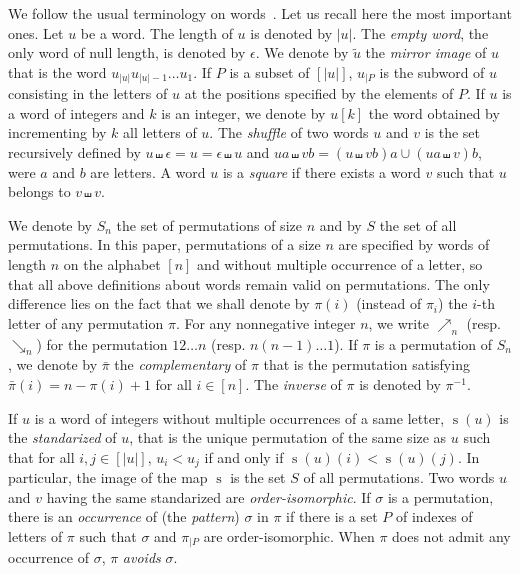 \documentclass[a4paper]{llncs}
\DeclareMathOperator{\STD}{\mathrm{s}}
\begin{document}
We follow the usual terminology on words~\cite{ChoffrutKarhumaki1997}.
Let us recall here the most important ones. Let $u$ be a word. The
length of $u$ is denoted by $|u|$. The {\em empty word}, the only word
of null length, is denoted by $\epsilon$. We denote by $\widetilde{u}$
the {\em mirror image} of $u$ that is the word
$u_{|u|} u_{|u| - 1} \dots u_1$. If $P$ is a subset of $[|u|]$, $u_{|P}$
is the subword of $u$ consisting in the letters of $u$ at the positions
specified by the elements of $P$. If $u$ is a word of integers and $k$
is an integer, we denote by $u[k]$ the word obtained by incrementing by
$k$ all letters of $u$. The {\em shuffle} of two words $u$ and $v$ is
the set recursively defined by
$u \shuffle \epsilon = u = \epsilon \shuffle u$ and
$ua \shuffle vb = (u \shuffle vb)a \cup (ua \shuffle v)b$, were $a$ and
$b$ are letters. A word $u$ is a {\em square} if there exists a word $v$
such that $u$ belongs to $v \shuffle v$.

We denote by $S_n$ the set of permutations of size $n$ and by $S$ the
set of all permutations. In this paper, permutations of a size $n$ are
specified by words of length $n$ on the alphabet $[n]$ and without
multiple occurrence of a letter, so that all above definitions about
words remain valid on permutations. The only difference lies on the
fact that we shall denote by $\pi(i)$ (instead of $\pi_i$) the $i$-th
letter of any permutation $\pi$. For any nonnegative integer $n$, we
write $\nearrow_{n}$ (resp. $\searrow_{n}$) for the permutation
$1 2 \dots n$ (resp. $n (n-1) \dots 1$). If $\pi$ is a permutation of
$S_n$, we denote by $\bar \pi$ the {\em complementary} of $\pi$ that is
the permutation satisfying $\bar \pi(i) = n - \pi(i) + 1$ for all
$i \in [n]$. The {\em inverse} of $\pi$ is denoted by $\pi^{-1}$.

If $u$ is a word of integers without multiple occurrences of a same
letter, $\STD(u)$ is the {\em standarized} of $u$, that is the unique
permutation of the same size as $u$ such that for all $i, j \in [|u|]$,
$u_i < u_j$ if and only if $\STD(u)(i) < \STD(u)(j)$. In particular, the
image of the map $\STD$ is the set $S$ of all permutations. Two words $u$
and $v$ having the same standarized are {\em order-isomorphic}. If
$\sigma$ is a permutation, there is an {\em occurrence} of (the
{\em pattern}) $\sigma$ in $\pi$ if there is a set $P$ of indexes of
letters of $\pi$ such that $\sigma$ and $\pi_{|P}$ are order-isomorphic.
When $\pi$ does not admit any occurrence of $\sigma$, $\pi$ {\em avoids}
$\sigma$.
\end{document}
